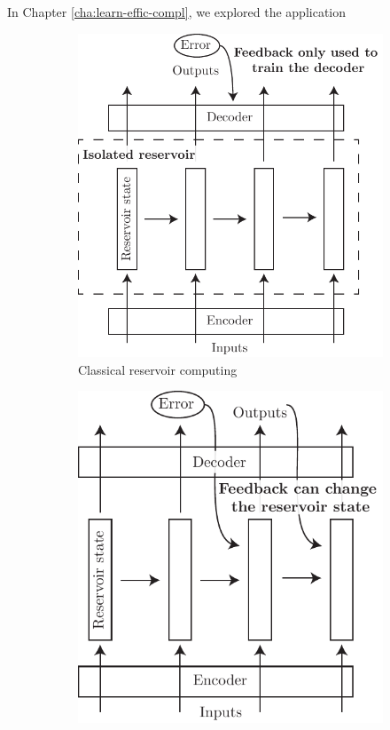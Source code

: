 In Chapter \ref{cha:learn-effic-compl}, we explored the application
\begin{figure}[htbp]
  \centering
  \begin{subfigure}[t]{.5\linewidth}
    \centering
    \includegraphics[width=\linewidth]{figures/classical_reservoir.pdf}
    \caption{Classical reservoir computing}
    \label{fig:classical_reservoir}
  \end{subfigure}
  \begin{subfigure}[t]{.45\linewidth}
    \centering
    \includegraphics[width=\linewidth]{figures/feedback_reservoir.pdf}

\end{subfigure}
\end{figure}
